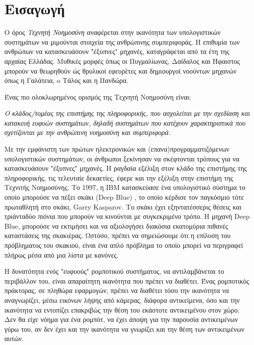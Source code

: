\chapter{Εισαγωγή}
\label{chapter:intro}

Ο όρος \emph{Τεχνητή Νοημοσύνη} αναφέρεται στην ικανότητα των υπολογιστικών
συστημάτων να μιμούνται στοιχεία της ανθρώπινης συμπεριφοράς.
Η επιθυμία των ανθρώπων να κατασκευάσουν "έξυπνες" μηχανές, καταγράφεται από
τα έτη της αρχαίας Ελλάδας. Μυθικές μορφές όπως οι Πυγμαλίωνας, Δαίδαλος και
Ήφαιστος μπορούν να θεωρηθούν ώς θρυλικοί εφευρέτες και δημιουργοί νοούντων
μηχανών όπως η Γαλάτεια, o Τάλος και η Πανδώρα.

Ένας πιο ολοκλωρημένος ορισμός της Τεχνητή Νοημοσύνη είναι:
\begin{displayquote}
\emph{
  Ο κλάδος/τομέας της επιστήμης της πληροφορικής, που ασχολείται
  με την σχεδίαση και κατακευή ευφυών συστημάτων, δηλαδή συστημάτων που
  κατέχουν χαρακτηριστικά που σχετίζονται με την ανθρώπινη νοημοσύνη και συμπεριφορά.
}
\end{displayquote}
Με την εμφάνιστη των πρώτων ηλεκτρονικών και (επανα)προγραμματιζόμενων υπολογιστικών συστημάτων,
οι άνθρωποι ξεκίνησαν να σκέφτονται τρόπους για να κατασκευάσουν "έξυπνες" μηχανές.
H ραγδαία εξέλιξη στον κλάδο της επιστήμης της πληροφορικής, τις τελευταίε
δεκαετίες, έφερε και την εξέλιξη στην επιστήμη της Τεχνιτής Νοημοσύνης.
Το 1997, η IBM κατασκεύασε ένα υπολογιστικό σύστημα το οποίο μπορούσε να
πέξει σκάκι (Deep Blue) \cite{campbell2002deep}, το οποίο κέρδισε τον παγκόσμιο
τότε πρωταθλητή στο σκάκι, Garry Kasparov. Το σκάκι έχει εξηντατέσσερις θέσεις
και τριάνταδύο πιόνια που μπορούν να κινούνται με συγκεκριμένο τρόπο. H μηχανή
Deep Blue, μπορούσε να εκτιμήσει και να αξιολογήσει διακόσια εκατομύρια
πιθανές καταστάσεις της σκακιέρας. Ωστόσο, πρέπει να σημειώσουμε ότι η επίλυση του
πρόβληματος του σκακιού, είναι ένα απλό πρόβλημα το οποίο μπορεί να περιγραφεί
πλήρως μέσα από μια λίστα με κανόνες.

Η δυνατότητα ενός "ευφυούς" ρομποτικού συστήματος, να αντιλαμβάνεται
το περιβάλλον του, είναι απαραίτητη ικανότητα που πρέπει να διαθέτει.
Ένας ρομποτικός πράκτορας, σε πληθώρα εφαρμογών, πρέπει να διαθέτει τόσο την
ικανότητα να αναγνωρίζει, μέσω εικόνων λήψης από κάμερας, διάφορα αντικείμενα,
όσο και την ικανότητα να εντοπίζει επακριβώς την θέση του
εκάστοτε αντικειμένου στον χώρο. Δεν θα είχε νόημα για ένα ρομπότ, να έχει άποψη
για την παρουσία αντικειμένων γύρω του, αν δεν έχει και την ικανότητα να γνωρίζει
και την θέση των αντικειμένων αυτών.

